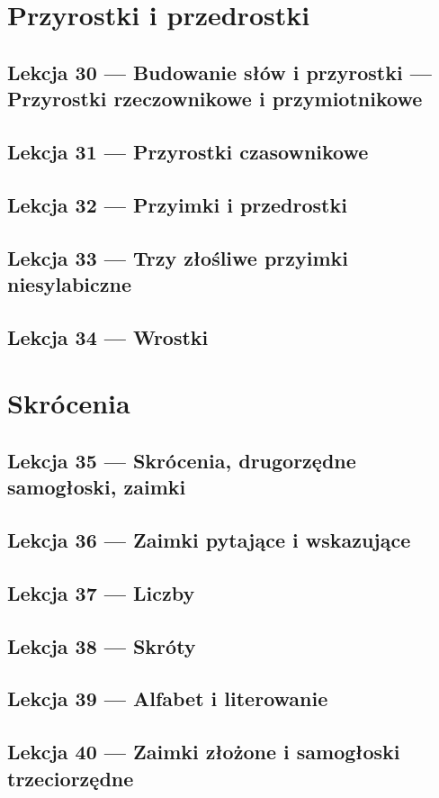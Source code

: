 \documentclass[12p, oneside]{book}
\begin{document}
\chapter{Przyrostki i przedrostki}
\section{Lekcja 30 --- Budowanie słów i przyrostki --- Przyrostki rzeczownikowe i przymiotnikowe}
\newpage
\section{Lekcja 31 --- Przyrostki czasownikowe}
\newpage
\section{Lekcja 32 --- Przyimki i przedrostki}
\newpage
\section{Lekcja 33 --- Trzy złośliwe przyimki niesylabiczne}
\newpage
\section{Lekcja 34 --- Wrostki}
\newpage
\chapter{Skrócenia}
\newpage
\section{Lekcja 35 --- Skrócenia, drugorzędne samogłoski, zaimki}
\newpage
\section{Lekcja 36 --- Zaimki pytające i wskazujące}
\newpage
\section{Lekcja 37 --- Liczby}
\newpage
\section{Lekcja 38 --- Skróty}
\newpage
\section{Lekcja 39 --- Alfabet i literowanie}
\newpage
\section{Lekcja 40 --- Zaimki złożone i samogłoski trzeciorzędne}
\newpage
\end{document}

